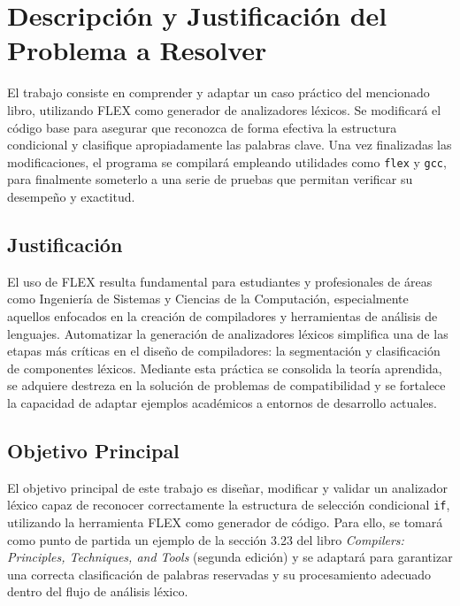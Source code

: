 \documentclass{article}
\begin{document}

\section{Descripción y Justificación del Problema a Resolver}\label{sec:descr}

El trabajo consiste en comprender y adaptar un caso práctico del mencionado libro, utilizando FLEX como generador de analizadores léxicos. Se modificará el código base para asegurar que reconozca de forma efectiva la estructura condicional y clasifique apropiadamente las palabras clave. Una vez finalizadas las modificaciones, el programa se compilará empleando utilidades como \texttt{flex} y \texttt{gcc}, para finalmente someterlo a una serie de pruebas que permitan verificar su desempeño y exactitud.

\subsection{Justificación}

El uso de FLEX resulta fundamental para estudiantes y profesionales de áreas como Ingeniería de Sistemas y Ciencias de la Computación, especialmente aquellos enfocados en la creación de compiladores y herramientas de análisis de lenguajes. Automatizar la generación de analizadores léxicos simplifica una de las etapas más críticas en el diseño de compiladores: la segmentación y clasificación de componentes léxicos. Mediante esta práctica se consolida la teoría aprendida, se adquiere destreza en la solución de problemas de compatibilidad y se fortalece la capacidad de adaptar ejemplos académicos a entornos de desarrollo actuales.


\subsection{Objetivo Principal}

El objetivo principal de este trabajo es diseñar, modificar y validar un analizador léxico capaz de reconocer correctamente la estructura de selección condicional \texttt{if}, utilizando la herramienta FLEX como generador de código. Para ello, se tomará como punto de partida un ejemplo de la sección 3.23 del libro \textit{Compilers: Principles, Techniques, and Tools} (segunda edición) y se adaptará para garantizar una correcta clasificación de palabras reservadas y su procesamiento adecuado dentro del flujo de análisis léxico.
\end{document}
